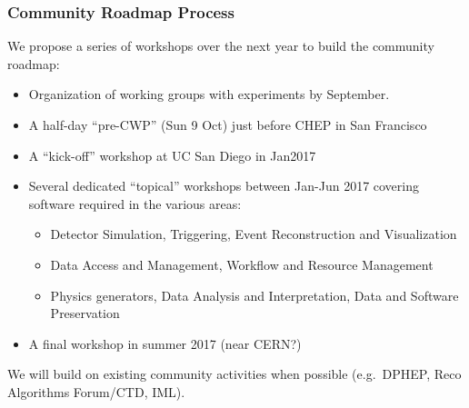 \begin{frame}
\frametitle{Community Roadmap Process}

We propose a series of workshops over the next year to build the community roadmap:

\begin{itemize}
\item Organization of working groups with experiments by September.
\item A half-day ``pre-CWP'' (Sun 9 Oct) just before CHEP in San Francisco
\item A ``kick-off'' workshop at UC San Diego in Jan2017
\item Several dedicated ``topical'' workshops between Jan-Jun 2017 covering software required in the various areas:
\begin{itemize}
\item Detector Simulation, Triggering, Event Reconstruction and Visualization
\item Data Access and Management, Workflow and Resource Management
\item Physics generators, Data Analysis and Interpretation, Data and Software Preservation
\end{itemize}
\item A final workshop in summer 2017 (near CERN?)
\end{itemize}

We will build on existing community activities when possible (e.g.\ DPHEP, Reco Algorithms Forum/CTD, IML). 

\end{frame}



